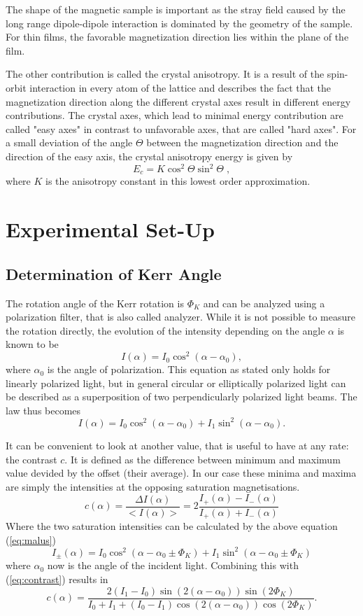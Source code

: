 \documentclass[a4paper]{scrartcl}
\numberwithin{equation}{section}
\numberwithin{figure}{section}
\numberwithin{table}{section}
\newcommand{\eq}[2]{\begin{equation}#1\label{#2}\end{equation}}
\newcommand{\Formel}[1]{(\ref{#1})}
\begin{document}
The shape of the magnetic sample is important as the stray field caused by the long range dipole-dipole interaction is dominated by the geometry of the sample. For thin films, the favorable magnetization direction lies within the plane of the film.

The other contribution is called the crystal anisotropy. It is a result of the spin-orbit interaction in every atom of the lattice and describes the fact that the magnetization direction along the different crystal axes result in different energy contributions. The crystal axes, which lead to minimal energy contribution are called "easy axes" in contrast to unfavorable axes, that are called "hard axes". For a small deviation of the angle $\Theta$ between the magnetization direction and the direction of the easy axis, the crystal anisotropy energy is given by
\eq{E_c=K \cos^2 \Theta \sin^2 \Theta \; , }{aniso}
where $K$ is the anisotropy constant in this lowest order approximation.


\section{Experimental Set-Up}
\subsection{Determination of Kerr Angle}
The rotation angle of the Kerr rotation is $\Phi_K$ and can be analyzed using a polarization filter, that is also called analyzer. While it is not possible to measure the rotation directly, the evolution of the intensity depending on the angle $\alpha$ is known to be
\eq{I(\alpha)=I_0 \cos^2(\alpha-\alpha_0) ,}{eq:malus}
where $\alpha_0$ is the angle of polarization. This equation as stated only holds for linearly polarized light, but in general circular or elliptically polarized light can be described as a superposition of two perpendicularly polarized light beams. The law thus becomes
\eq{I(\alpha) = I_0 \cos^2(\alpha-\alpha_0) + I_1 \sin^2(\alpha-\alpha_0) .}{}

It can be convenient to look at another value, that is useful to have at any rate: the contrast $c$. It is defined as the difference between minimum and maximum value devided by the offset (their average). In our case these minima and maxima are simply the intensities at the opposing saturation magnetisations.
\eq{c(\alpha)=\frac{\Delta I(\alpha)}{<I(\alpha)>} = 2\frac{I_+(\alpha)-I_-(\alpha)}{I_+(\alpha)+I_-(\alpha)} }{eq:contrast}
Where the two saturation intensities can be calculated by the above equation \Formel{eq:malus}
\eq{I_\pm(\alpha) = I_0 \cos^2(\alpha-\alpha_0\pm\Phi_K) + I_1 \sin^2(\alpha-\alpha_0\pm\Phi_K) }{}
where $\alpha_0$ now is the angle of the incident light. Combining this with \Formel{eq:contrast} results in
\eq{c(\alpha) = \frac{2(I_1-I_0) \sin(2(\alpha-\alpha_0)) \sin(2\Phi_K) } { I_0+I_1+ (I_0-I_1)\cos(2(\alpha-\alpha_0)) \cos(2\Phi_K)} .}{}
\end{document}
